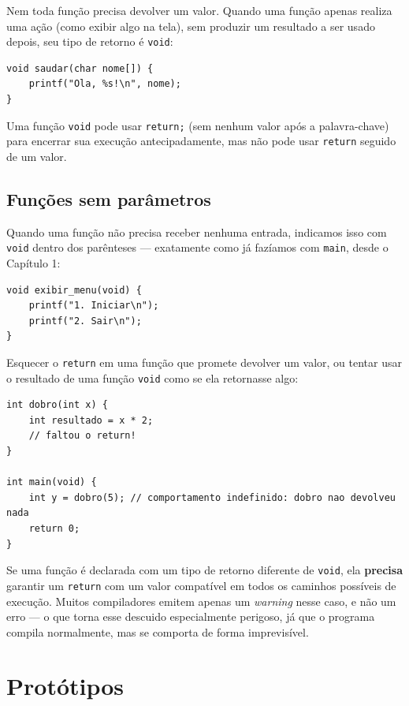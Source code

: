 \documentclass[12pt,a4paper,oneside]{extreport}
\begin{document}
Nem toda função precisa devolver um valor. Quando uma função apenas realiza uma ação (como exibir algo na tela), sem produzir um resultado a ser usado depois, seu tipo de retorno é \texttt{void}:

\begin{lstlisting}
void saudar(char nome[]) {
    printf("Ola, %s!\n", nome);
}
\end{lstlisting}

Uma função \texttt{void} pode usar \texttt{return;} (sem nenhum valor após a palavra-chave) para encerrar sua execução antecipadamente, mas não pode usar \texttt{return} seguido de um valor.

\subsection{Funções sem parâmetros}

Quando uma função não precisa receber nenhuma entrada, indicamos isso com \texttt{void} dentro dos parênteses — exatamente como já fazíamos com \texttt{main}, desde o Capítulo 1:

\begin{lstlisting}
void exibir_menu(void) {
    printf("1. Iniciar\n");
    printf("2. Sair\n");
}
\end{lstlisting}

\begin{errocomum}
Esquecer o \texttt{return} em uma função que promete devolver um valor, ou tentar usar o resultado de uma função \texttt{void} como se ela retornasse algo:
\begin{lstlisting}
int dobro(int x) {
    int resultado = x * 2;
    // faltou o return!
}

int main(void) {
    int y = dobro(5); // comportamento indefinido: dobro nao devolveu nada
    return 0;
}
\end{lstlisting}
Se uma função é declarada com um tipo de retorno diferente de \texttt{void}, ela \textbf{precisa} garantir um \texttt{return} com um valor compatível em todos os caminhos possíveis de execução. Muitos compiladores emitem apenas um \textit{warning} nesse caso, e não um erro — o que torna esse descuido especialmente perigoso, já que o programa compila normalmente, mas se comporta de forma imprevisível.
\end{errocomum}

\section{Protótipos}
\end{document}
